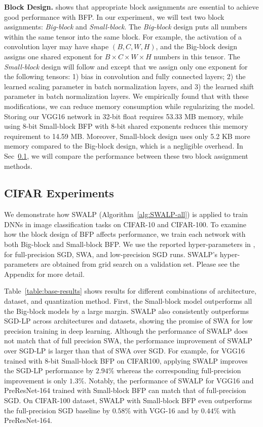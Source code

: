 \documentclass{article}
\begin{document}
\textbf{Block Design.}
\citet{error-analysis} shows that appropriate block assignments are essential to achieve good performance with BFP.
In our experiment, we will test two block assignments: \emph{Big-block} and \emph{Small-block}.
The \emph{Big-block} design puts all numbers within the same tensor into the same block.
For example, the activation of a convolution layer may have shape $(B, C, W, H)$, and the Big-block design assigns one shared exponent for $B \times C \times W \times H$ numbers in this tensor.
The \emph{Small-block} design will follow \citet{error-analysis} and \citet{dorefa-net} except that we assign only one exponent for the following tensors: 1) bias in convolution and fully connected layers; 2) the learned scaling parameter in batch normalization layers, and 3) the learned shift parameter in batch normalization layers.
We empirically found that with these modifications, we can reduce memory consumption while regularizing the model. 
Storing our VGG16 network in 32-bit float requires 53.33 MB memory, while using 8-bit Small-block BFP with 8-bit shared exponents reduces this memory requirement to 14.59 MB.
Moreover, Small-block design uses only 5.2 KB more memory compared to the Big-block design, which is a negligible overhead.
In Sec~\ref{sec:expr-perf}, we will compare the performance between these two block assignment methods.


\subsection{CIFAR Experiments}\label{sec:expr-perf}
We demonstrate how SWALP (Algorithm~\ref{alg:SWALP-all}) is applied to train DNNs in image classification tasks on CIFAR-10 and CIFAR-100.
To examine how the block design of BFP affects performance, we train each network with both Big-block and Small-block BFP.
We use the reported hyper-parameters in \citet{SWA}, for full-precision SGD, SWA, and low-precision SGD runs.
SWALP's hyper-parameters are obtained from grid search on a validation set.
Please see the Appendix for more detail.

Table~\ref{table:base-results} shows results for different combinations of architecture, dataset, and quantization method.
First, the Small-block model outperforms all the Big-block models by a large margin.
SWALP also consistently outperforms SGD-LP across architectures and datasets, showing the promise of SWA for low precision training in deep learning.
Although the performance of SWALP does not match that of full precision SWA, the performance improvement of SWALP over SGD-LP is larger than that of SWA over SGD.
For example, for VGG16 trained with 8-bit Small-block BFP on CIFAR100, applying SWALP improves the SGD-LP performance by $2.94\%$ whereas the corresponding full-precision improvement is only $1.3\%$.
Notably, the performance of SWALP for VGG16 and PreResNet-164 trained with Small-block BFP can match that of full-precision SGD. 
On CIFAR-100 dataset, SWALP with Small-block BFP even outperforms the full-precision SGD baseline by $0.58\%$ with VGG-16 and by $0.44\%$ with PreResNet-164.
\end{document}
